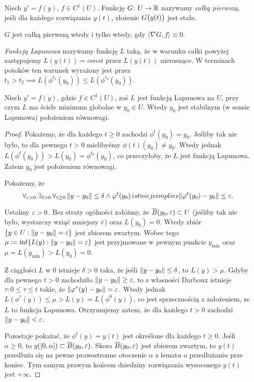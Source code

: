 %
\begin{definition}
  Niech $y' = f(y)$, $f \in C^1(U)$. Funkcję $G \colon U \to \R$ nazywamy \emph{całką pierwszą}, jeśli dla każdego 
  rozwiązania $y(t)$, złożenie $G \p[\big]{y(t)}$ jest stałe.
\end{definition}
%
\begin{lemma}
  $G$ jest całką pierwszą wtedy i tylko wtedy, gdy $\langle \nabla G, f \rangle \equiv 0$.
\end{lemma}
%
\begin{definition}
	\emph{Funkcją Lapunowa} nazywamy funkcję $L$ taką, że w warunku całki powyżej zastępujemy
	$L(y(t)) = const$ przez $L(y(t))$ nierosnące. W terminach potoków ten warunek wyrażony jest przez 
	$t_1 > t_2 \implies L(\phi^{t_1}(y_0)) \le L(\phi^{t_2}(y_0))$.
\end{definition}
%
\begin{theorem}
	Niech $y' = f(y)$, gdzie $f \in C^1(U)$, zaś $L$ jest funkcją Lapunowa na $U$, przy czym $L$ ma ścisłe minimum
	globalne w $y_0 \in U$. Wtedy $y_0$ jest stabilnym (w sensie Lapunowa) położeniem równowagi.
\end{theorem}
%
\begin{proof}
	Pokażemy, że dla każdego $t \ge 0$ zachodzi $\phi^t(y_0) = y_0$. Jeśliby tak nie było, to dla pewnego $t > 0$
	mielibyśmy $\phi(t)(y_0) \ne y_0$. Wtedy jednak $L(\phi^t(y_0)) > L(y_0) = \phi^{t_0}(y_0)$, co przeczyłoby, że
	$L$ jest funkcją Lapunowa. Zatem $y_0$ jest położeniem równowagi.
	
	Pokażemy, że
	\begin{equation*}
	\forall_{\eps > 0} \, \exists_{\delta > 0} \, \forall_{t \ge 0} \, \norm{ y - y_0} \le \delta \land \phi^t(y_0) \,  istnieje  implies \norm{ \phi^t( y_0 ) - y_0 } \le \eps .
	\end{equation*}
	
	Ustalmy $\eps > 0$. Bez straty ogólności załóżmy, że $\overline{B}(y_0, \eps) \subset U$ (jeśliby tak nie było, wystarczy 
	wziąć mniejszy $\eps$) oraz $L(y_0) = 0$. Wtedy zbiór $\{ y \in U : \norm{ y - y_0 } = \eps \}$ jest zbiorem zwartym.
	Wobec tego $\mu \coloneqq \inf\{ L(y) : \norm{ y - y_0 } = \eps \}$ jest przyjmowane w pewnym punkcie $y_{\min}$ oraz
	$\mu = L(y_{\min}) > L(y_0) = 0$.
	
	Z ciągłości $L$ w 0 istnieje $\delta > 0$ taka, że jeśli $\norm{ y - y_0 } \le \delta$, to $L(y) > \mu$. Gdyby dla pewnego 
	$t > 0$ zachodziło $\norm{ y - y_0 } \ge \eps$, to z własności Darboux istnieje $\tau \colon 0 \le \tau \le t$ takie, że 
	$\norm{ \phi^\tau(y) - y_0 } = \eps$. Wtedy jednak $L(\phi^\tau(y)) \le \mu > L(y) = L(\phi^0(y))$, co jest sprzecznością
	z założeniem, ze $L$ to funkcja Lapunowa. Otrzymujemy zatem, że dla każdego $t>0$ zachodzi $\norm{ y - y_0 } < \eps$.
	
	Pozostaje pokażać, że $\phi^t(y) = y(t)$ jest określone dla każdego $t \ge 0$. Jeśli $\alpha \ge 0$, to $y([0, \alpha]) \subset \overline{B}(y_0, \eps)$. Skoro $\overline{B}(y_0, \eps)$ jest zbiorem zwartym, to $y(t)$ przedłuża się na pewne
	prawostronne otoczenie $\alpha$ z lematu o przedłużaniu prze koniec. Tym samym prawym końcem dziedziny rozwiązania
	wysoconego $y(t)$ jest $+\infty$. 
\end{proof}
%